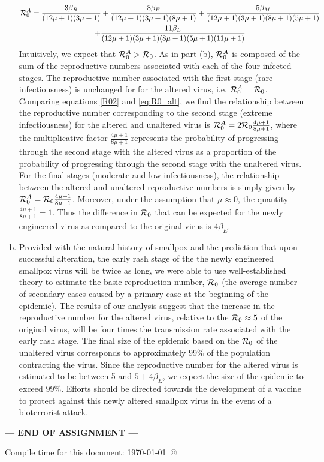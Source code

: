 \documentclass[12pt]{article}\usepackage[]{graphicx}\usepackage[]{color}
\begin{document}
\begin{enumerate}[(a)]
\begin{multline}\label{eq:R0_alt}
{\cal R}_0^A = \frac{3\beta_R}{(12 \mu + 1)(3 \mu + 1)} + \frac{8\beta_E}{(12 \mu + 1)(3 \mu + 1)  (8 \mu + 1)} + \frac{5\beta_M}{(12 \mu + 1)(3 \mu + 1)  (8 \mu + 1) (5 \mu + 1)} \\ + \frac{11 \beta_L}{(12 \mu + 1)(3 \mu + 1)  (8 \mu + 1) (5 \mu + 1)(11\mu+1)}
\end{multline}
Intuitively, we expect that ${\cal R}_0^A > {\cal R}_0$. As in part (b), ${\cal R}_0^A$ is composed of the sum of the reproductive numbers associated with each of the four infected stages. The reproductive number associated with the first stage (rare infectiousness) is unchanged for for the altered virus, i.e. ${\cal R}_0^A = {\cal R}_0$. Comparing equations \eqref{R02} and \eqref{eq:R0_alt}, we find the relationship between the reproductive number corresponding to the second stage (extreme infectiousness) for the altered and unaltered virus is ${\cal R}_0^A =2  {\cal R}_0 \frac{4 \mu + 1}{8 \mu + 1}$, where the multiplicative factor $\frac{4 \mu + 1}{8 \mu + 1}$ represents the probability of progressing through the second stage with the altered virus as a proportion of the probability of progressing through the second stage with the unaltered virus. For the final stages (moderate and low infectiousness), the relationship between the altered and unaltered reproductive numbers is simply given by ${\cal R}_0^A = {\cal R}_0  \frac{4 \mu + 1}{8 \mu + 1}$.
Moreover, under the assumption that $\mu \approx 0$, the quantity $\frac{4 \mu + 1}{8 \mu + 1} = 1$. Thus the difference in ${\cal R}_0$ that can be expected for the newly engineered virus as compared to the original virus is $4\beta_E$.


\item

Provided with the natural history of smallpox and the prediction that upon successful alteration, the early rash stage of the the newly engineered smallpox virus will be twice as long, we were able to use well-established theory to estimate the basic reproduction number, ${\cal R}_0$ (the average number
of secondary cases caused by a primary case at the beginning of the epidemic). The results of our analysis suggest that the increase in the reproductive number for the altered virus, relative to the ${\cal R}_0\approx 5$ of the original virus, will be four times the transmission rate associated with the early rash stage. 
The final size of the epidemic based on the ${\cal R}_0$ of the unaltered virus corresponds to approximately 99$\%$ of the population contracting the virus. Since the reproductive number for the altered virus is estimated to be between 5 and $5 + 4\beta_E$, we expect the size of the epidemic to exceed 99$\%$. Efforts should be directed towards the development of a vaccine to protect against this newly altered smallpox virus in the event of a bioterrorist attack. 


\end{enumerate}

\bigskip
\centerline{\bf--- END OF ASSIGNMENT ---}

\bigskip
Compile time for this document:
\today\ @ \thistime
\end{document}
